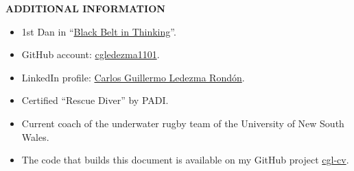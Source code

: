 \documentclass[10pt]{article}
\begin{document}
\vspace{6mm}

\textbf{\uppercase{Additional information}}

\begin{itemize}
	\item 1st Dan in ``\href{http://www.blackbeltinthinking.com/}{Black Belt in Thinking}''.
	\item GitHub account: \href{https://github.com/cgledezma1101}{cgledezma1101}.
	\item LinkedIn profile: \href{https://au.linkedin.com/in/cgledezma}{Carlos Guillermo Ledezma Rondón}.
	\item Certified ``Rescue Diver'' by PADI.
	\item Current coach of the underwater rugby team of the University of New South Wales.
	\item The code that builds this document is available on my GitHub project \href{https://github.com/cgledezma1101/cgl-cv}{cgl-cv}.
\end{itemize}
\end{document}
